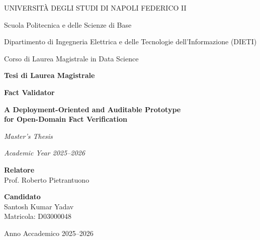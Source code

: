 \documentclass[12pt,a4paper,openany]{report}
\begin{document}
\hypersetup{pageanchor=false}

\begin{titlepage}
\centering
{\large UNIVERSIT\`A DEGLI STUDI DI NAPOLI FEDERICO II\par}
\vspace{0.15cm}
{\normalsize Scuola Politecnica e delle Scienze di Base\par}
\vspace{0.1cm}
{\normalsize Dipartimento di Ingegneria Elettrica e delle Tecnologie dell'Informazione (DIETI)\par}
\vspace{0.1cm}
{\normalsize Corso di Laurea Magistrale in Data Science\par}
\vspace{1.2cm}


{\Large \textbf{Tesi di Laurea Magistrale}\par}
\vspace{0.9cm}
{\LARGE \textbf{Fact Validator}\par}
\vspace{0.4cm}
{\Large \textbf{A Deployment-Oriented and Auditable Prototype\\for Open-Domain Fact Verification}\par}
\vspace{0.6cm}
{\normalsize\itshape Master's Thesis\par}
{\normalsize\itshape Academic Year 2025--2026\par}
\vfill
\begin{minipage}[t]{0.48\textwidth}
\raggedright
\textbf{Relatore}\\
Prof. Roberto Pietrantuono
\end{minipage}
\hfill
\begin{minipage}[t]{0.48\textwidth}
\raggedleft
\textbf{Candidato}\\
Santosh Kumar Yadav\\
Matricola: D03000048
\end{minipage}
\vfill
{\normalsize Anno Accademico 2025--2026\par}
\end{titlepage}

\clearpage
\thispagestyle{empty}
\null
\clearpage

\hypersetup{pageanchor=true}
\end{document}
